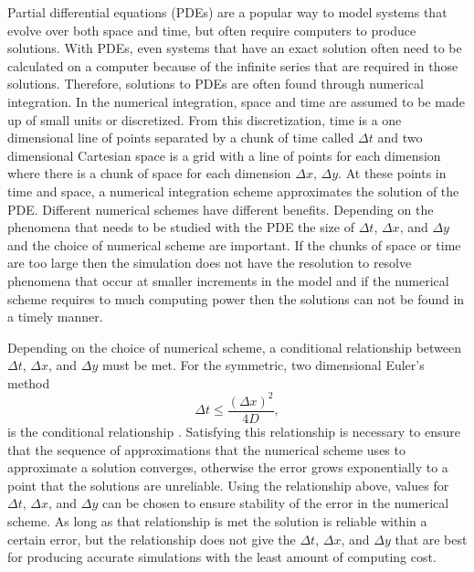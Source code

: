 Partial differential equations (PDEs) are a popular way to model systems that evolve over both space and time, but often require computers to produce solutions. With PDEs, even systems that have an exact solution often need to be calculated on a computer because of the infinite series that are required in those solutions. Therefore, solutions to PDEs are often found through numerical integration. In the numerical integration, space and time are assumed to be made up of small units or discretized. From this discretization, time is a one dimensional line of points separated by a chunk of time called $\Delta t$ and two dimensional Cartesian space is a grid with a line of points for each dimension where there is a chunk of space for each dimension $\Delta x$, $\Delta y$. At these points in time and space, a numerical integration scheme approximates the solution of the PDE. Different numerical schemes have different benefits. Depending on the phenomena that needs to be studied with the PDE the size of $\Delta t$, $\Delta x$, and $\Delta y$ and the choice of numerical scheme are important. If the chunks of space or time are too large then the simulation does not have the resolution to resolve phenomena that occur at smaller increments in the model and if the numerical scheme requires to much computing power then the solutions can not be found in a timely manner.

Depending on the choice of numerical scheme, a conditional relationship between $\Delta t$, $\Delta x$, and $\Delta y$ must be met. For the symmetric, two dimensional Euler's method $$ \Delta t \leq \frac{(\Delta x)^{2}}{4 D},$$ is the conditional relationship \citep{wendroff_difference_1968,olsen-kettle_numerical_nodate}. Satisfying this relationship is necessary to ensure that the sequence of approximations that the numerical scheme uses to approximate a solution converges, otherwise the error grows exponentially to a point that the solutions are unreliable. Using the relationship above, values for $\Delta t$, $\Delta x$, and $\Delta y$ can be chosen to ensure stability of the error in the numerical scheme. As long as that relationship is met the solution is reliable within a certain error, but the relationship does not give the $\Delta t$, $\Delta x$, and $\Delta y$ that are best for producing accurate simulations with the least amount of computing cost.

